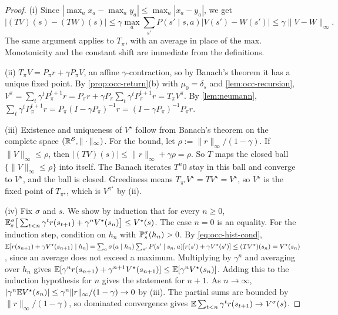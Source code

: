 \begin{proof}
(i) Since $|\max_ax_a-\max_ay_a|\le\max_a|x_a-y_a|$, we get
\[
|(TV)(s)-(TW)(s)|\le\gamma\max_a\sum_{s'}P(s'\mid s,a)|V(s')-W(s')|\le\gamma\|V-W\|_\infty .
\] The same argument applies to $T_\pi$, with an average in place of the max.
Monotonicity and the constant shift are immediate from the definitions.

(ii) $T_\pi V=P_\pi r+\gamma P_\pi V$, an affine $\gamma$-contraction, so by Banach's theorem it has a unique fixed point.
By \cref{prop:occ-return}(b) with $\mu_0=\delta_s$ and \cref{lem:occ-recursion}, $V^\pi=\sum_t\gamma^tP_\pi^{t+1}r=P_\pi r+\gamma P_\pi\sum_t\gamma^tP_\pi^{t+1}r=T_\pi V^\pi$.
By \cref{lem:neumann}, $\sum_t\gamma^tP_\pi^{t+1}r=P_\pi(I-\gamma P_\pi)^{-1}r=(I-\gamma P_\pi)^{-1}P_\pi r$.

(iii) Existence and uniqueness of $V^\star$ follow from Banach's theorem on the complete space $(\mathbb{R}^{\mathcal{S}},\|\cdot\|_\infty)$.
For the bound, let $\rho:=\|r\|_\infty/(1-\gamma)$. If $\|V\|_\infty\le\rho$, then $|(TV)(s)|\le\|r\|_\infty+\gamma\rho=\rho$.
So $T$ maps the closed ball $\{\|V\|_\infty\le\rho\}$ into itself. The Banach iterates $T^n0$ stay in this ball and converge to $V^\star$, and the ball is closed.
Greediness means $T_{\pi^\star}V^\star=TV^\star=V^\star$, so $V^\star$ is the fixed point of $T_{\pi^\star}$, which is $V^{\pi^\star}$ by (ii).

(iv) Fix $\sigma$ and $s$. We show by induction that for every $n\ge0$,
$\mathbb{E}^\sigma_s\big[\sum_{t<n}\gamma^tr(s_{t+1})+\gamma^nV^\star(s_n)\big]\le V^\star(s)$.
The case $n=0$ is an equality.
For the induction step, condition on $h_n$ with $\mathbb{P}^\sigma_s(h_n)>0$. By \eqref{eq:occ-hist-cond},
$\mathbb{E}[r(s_{n+1})+\gamma V^\star(s_{n+1})\mid h_n]=\sum_a\sigma(a\mid h_n)\sum_{s'}P(s'\mid s_n,a)[r(s')+\gamma V^\star(s')]\le(TV^\star)(s_n)=V^\star(s_n)$,
since an average does not exceed a maximum.
Multiplying by $\gamma^n$ and averaging over $h_n$ gives $\mathbb{E}[\gamma^nr(s_{n+1})+\gamma^{n+1}V^\star(s_{n+1})]\le\mathbb{E}[\gamma^nV^\star(s_n)]$.
Adding this to the induction hypothesis for $n$ gives the statement for $n+1$.
As $n\to\infty$, $|\gamma^n\mathbb{E} V^\star(s_n)|\le\gamma^n\|r\|_\infty/(1-\gamma)\to0$ by (iii).
The partial sums are bounded by $\|r\|_\infty/(1-\gamma)$, so dominated convergence gives $\mathbb{E}\sum_{t<n}\gamma^tr(s_{t+1})\to V^\sigma(s)$.
\end{proof}

